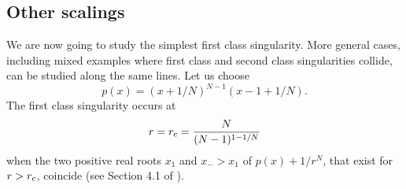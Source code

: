 \documentclass[a4paper,12pt]{article}
\def\rc{r_{\rm c}}\def\gc{g_{\rm c}}
\begin{document}
{\subsection{Other scalings}
%
We are now going to study the simplest first class singularity. More 
general cases, including mixed examples where first class and second class 
singularities collide, can be studied along the same lines. Let us choose
%
\begin{equation}
\label{p2nd}
p(x) = (x+1/N)^{N-1} (x-1+1/N).
\end{equation}
%
The first class singularity occurs at
%
\begin{equation}
\label{crit1st}
r=\rc = {N\over (N-1)^{1-1/N}}
\end{equation}
%
when the two positive real roots $x_{1}$ and $x_{-}>x_{1}$
of $p(x)+1/r^{N}$, that exist for $r>\rc$, coincide (see Section 4.1 of
\cite{fer}).
%
}
\end{document}
